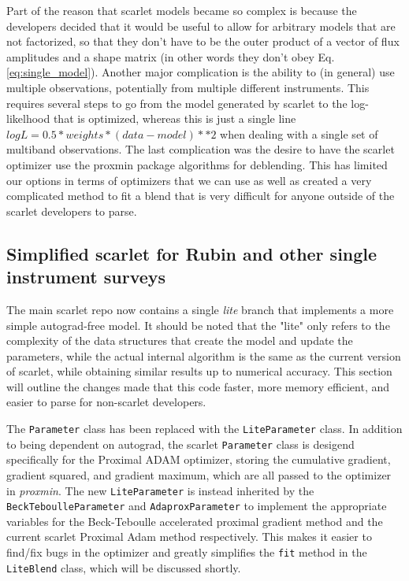 \documentclass[DM,authoryear,toc]{lsstdoc}
\begin{document}
Part of the reason that scarlet models became so complex is because the developers decided that it would be useful to allow for arbitrary models that are not factorized, so that they don't have to be the outer product of a vector of flux amplitudes and a shape matrix (in other words they don't obey Eq. \ref{eq:single_model}). Another major complication is the ability to (in general) use multiple observations, potentially from multiple different instruments. This requires several steps to go from the model generated by scarlet to the log-likelhood that is optimized, whereas this is just a single line $logL = 0.5*weights*(data-model)**2$ when dealing with a single set of multiband observations. The last complication was the desire to have the scarlet optimizer use the proxmin package algorithms for deblending. This has limited our options in terms of optimizers that we can use as well as created a very complicated method to fit a blend that is very difficult for anyone outside of the scarlet developers to parse.

\subsection{Simplified scarlet for Rubin and other single instrument surveys}

The main scarlet repo now contains a single \emph{lite} branch that implements a more simple autograd-free model. It should be noted that the "lite" only refers to the complexity of the data structures that create the model and update the parameters, while the actual internal algorithm is the same as the current version of scarlet, while obtaining similar results up to numerical accuracy. This section will outline the changes made that this code faster, more memory efficient, and easier to parse for non-scarlet developers.

The \texttt{Parameter} class has been replaced with the \texttt{LiteParameter} class. In addition to being dependent on autograd, the scarlet \texttt{Parameter} class is desigend specifically for the Proximal ADAM optimizer, storing the cumulative gradient, gradient squared, and gradient maximum, which are all passed to the optimizer in \emph{proxmin}. The new \texttt{LiteParameter} is instead inherited by the \texttt{BeckTeboulleParameter} and \texttt{AdaproxParameter} to implement the appropriate variables for the Beck-Teboulle accelerated proximal gradient method and the current scarlet Proximal Adam method respectively. This makes it easier to find/fix bugs in the optimizer and greatly simplifies the \texttt{fit} method in the \texttt{LiteBlend} class, which will be discussed shortly.
\end{document}
